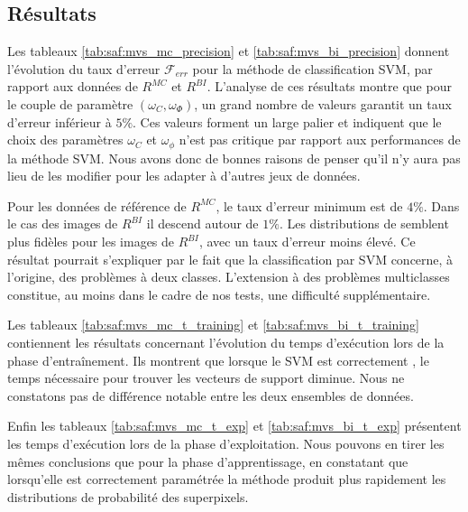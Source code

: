 \subsection{Résultats  }
Les tableaux \ref{tab:saf:mvs_mc_precision} et \ref{tab:saf:mvs_bi_precision} donnent l'évolution du taux d'erreur $\mathcal{F}_{err}$ pour la méthode de classification SVM, par rapport aux données de  $R^{MC}$ et  $R^{BI}$.  L'analyse de ces résultats montre que pour le couple de paramètre $(\omega_{C},\omega_{\Phi})$, un grand nombre de valeurs  garantit un taux d'erreur inférieur à $5 \%$. Ces valeurs forment un large palier et indiquent que le choix des paramètres $\omega_{C}$ et $\omega_{\phi}$ n'est pas critique par rapport aux performances de la méthode SVM. Nous avons donc de bonnes raisons de penser qu'il n'y aura pas lieu de les modifier pour les adapter à d'autres jeux de données. 

Pour les données de référence de $R^{MC}$, le taux d'erreur minimum est de $4 \%$.  Dans le cas des images de $R^{BI}$  il descend autour de $1\%$. Les distributions de  semblent plus fidèles pour les images de $R^{BI}$, avec un taux d'erreur moins élevé. Ce résultat pourrait s'expliquer par le fait que la classification par SVM concerne, à l'origine, des problèmes à deux classes. L'extension à des problèmes multiclasses constitue, au moins dans le cadre de nos tests, une difficulté supplémentaire. 

Les tableaux \ref{tab:saf:mvs_mc_t_training} et \ref{tab:saf:mvs_bi_t_training} contiennent les résultats concernant l'évolution du temps d'exécution lors de la phase d'entraînement. Ils montrent que lorsque le SVM est correctement , le temps nécessaire pour trouver les vecteurs de support diminue. Nous ne constatons pas de différence notable entre les deux ensembles de données.

Enfin\modif{,} les tableaux \ref{tab:saf:mvs_mc_t_exp} et \ref{tab:saf:mvs_bi_t_exp} présentent les temps d'exécution lors de la phase d'exploitation. Nous pouvons en tirer les mêmes conclusions que pour la phase d'apprentissage, en constatant que\modif{,} lorsqu'elle est correctement paramétrée\modif{,} la méthode produit plus rapidement les distributions de probabilité des superpixels.

